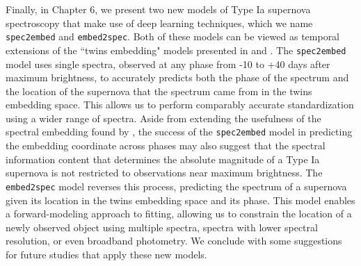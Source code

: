 Finally, in Chapter 6, we present two new models of Type Ia supernova spectroscopy that make use of deep learning techniques, which we name \texttt{spec2embed} and \texttt{embed2spec}. Both of these models can be viewed as temporal extensions of the ``twins embedding" models presented in \citet{boone_twins_2020a} and \citet{boone_twins_2020b}. The \texttt{spec2embed} model uses single spectra, observed at any phase from -10 to +40 days after maximum brightness, to accurately predicts both the phase of the spectrum and the location of the supernova that the spectrum came from in the twins embedding space. This allows us to perform comparably accurate standardization using a wider range of spectra. Aside from extending the usefulness of the spectral embedding found by \citet{boone_twins_2020a}, the success of the \texttt{spec2embed} model in predicting the embedding coordinate across phases may also suggest that the spectral information content that determines the absolute magnitude of a Type Ia supernova is not restricted to observations near maximum brightness. The \texttt{embed2spec} model reverses this process, predicting the spectrum of a supernova given its location in the twins embedding space and its phase. This model enables a forward-modeling approach to fitting, allowing us to constrain the location of a newly observed object using multiple spectra, spectra with lower spectral resolution, or even broadband photometry. We conclude with some suggestions for future studies that apply these new models.
